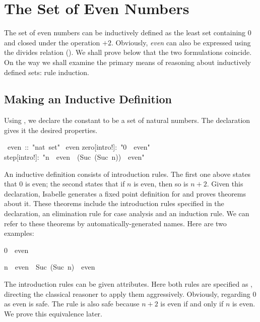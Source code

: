 \section{The Set of Even Numbers}

The set of even numbers can be inductively defined as the least set
containing 0 and closed under the operation $+2$.  Obviously,
\emph{even} can also be expressed using the divides relation (). 
We shall prove below that the two formulations coincide.  On the way we
shall examine the primary means of reasoning about inductively defined
sets: rule induction.

\subsection{Making an Inductive Definition}

Using , we declare the constant  to be a set
of natural numbers. The  declaration gives it the
desired properties.
\begin{isabelle}
\ even\ ::\ "nat\ set"\isanewline
{}\ even\isanewline
{}\isanewline
zero[intro!]:\ "0\ \isasymin \ even"\isanewline
step[intro!]:\ "n\ \isasymin \ even\ \isasymLongrightarrow \ (Suc\ (Suc\
n))\ \isasymin \ even"
\end{isabelle}

An inductive definition consists of introduction rules.  The first one
above states that 0 is even; the second states that if $n$ is even, then so
is
$n+2$.  Given this declaration, Isabelle generates a fixed point definition
for \isa{even} and proves theorems about it.  These theorems include the
introduction rules specified in the declaration, an elimination rule for case
analysis and an induction rule.  We can refer to these theorems by
automatically-generated names.  Here are two examples:
%
\begin{isabelle}
0\ \isasymin \ even
\par\smallskip
n\ \isasymin \ even\ \isasymLongrightarrow \ Suc\ (Suc\ n)\ \isasymin \
even%
\rulename{even.step}
\end{isabelle}

The introduction rules can be given attributes.  Here both rules are
specified as , directing the classical reasoner to 
apply them aggressively. Obviously, regarding 0 as even is safe.  The
\isa{step} rule is also safe because $n+2$ is even if and only if $n$ is
even.  We prove this equivalence later.

